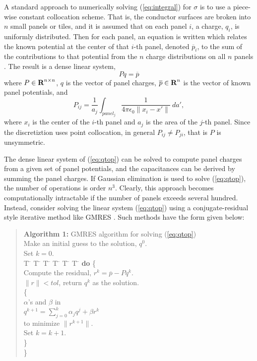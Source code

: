 A standard approach to numerically solving (\ref{eq:integral}) for $
\sigma $ is to use a piece-wise constant collocation scheme. That is,
the conductor surfaces are broken into $ n $ small panels or tiles, and
it is assumed that on each panel $ i $, a charge, $ q_i$, is uniformly
distributed.  Then for each panel, an equation is written which
relates the known potential at the center of that $ i$-th panel,
denoted $\overline{p}_i $, to the sum of the contributions to that
potential from the $ n $ charge distributions on all $ n $ panels
\cite{rao84}.  The result is a dense linear system,
\begin{equation}
P q = \overline{p}
\label{eq:qtop}
\end{equation}
where $ P \in \mbox{\bf R}^{n\times n}$, $q$ is the
vector of panel charges, $\overline{p} \in \mbox{\bf R}^n$ 
is the vector of known panel potentials, and
\begin{equation}
P_{ij} = \frac{1}{a_j} 
\int_{panel_j} \frac{1}{ 4\pi\epsilon_0\|  x_i-x' \| }\: da',
\label{eq:pcoeff}
\end{equation}
where $ x_i $ is the center of the $ i$-th panel and $ a_j $ is the
area of the $ j$-th panel. Since the discretiztion uses point collocation,
in general $P_{ij} \neq P_{ji}$, that is $P$ is unsymmetric.

The dense linear system of (\ref{eq:qtop}) can be solved to compute
panel charges from a given set of panel potentials, and the
capacitances can be derived by summing the panel charges.  If Gaussian
elimination is used to solve
(\ref{eq:qtop}), the number of operations is order $ n^3 $.  Clearly,
this approach becomes computationally intractable if the number of
panels exceeds several hundred.  Instead, consider solving the linear 
system (\ref{eq:qtop}) using a conjugate-residual style iterative
method like GMRES \cite{saad86}.  Such methods have the form given
below:

\begin{singlespace}
\begin{quote}
\begin{tabbing}
{\bf Algorithm 1:} GMRES algorithm for solving (\ref{eq:qtop})\\
Make an initial guess to the solution, $q^0$.\\
Set $k = 0$.\\
T \= \kill
\>T \= \kill
\>\>T \= \kill
\>\>\>T \= \kill
\>\>\>\>T \= \kill
\>\>\>\>\>T \= \kill
{\bf do} \{\=\\
\>Compute the residual, $r^k=\overline{p}-Pq^k$.\\
  $\|r\|<tol$, return $q^k$ as the solution.\\
 \{\=\\
\> $ \alpha $'s and $ \beta $ in \\
\>\>\>\>\>\> $q^{k+1} = \sum_{j=0}^k \alpha_j q^j + \beta r^k$\\
\>\>to minimize $ \| r^{k+1} \| $.\\
\>\>Set $k = k+1$.\\
\>\}\\
\}
\end{tabbing}
\end{quote}
\end{singlespace}

